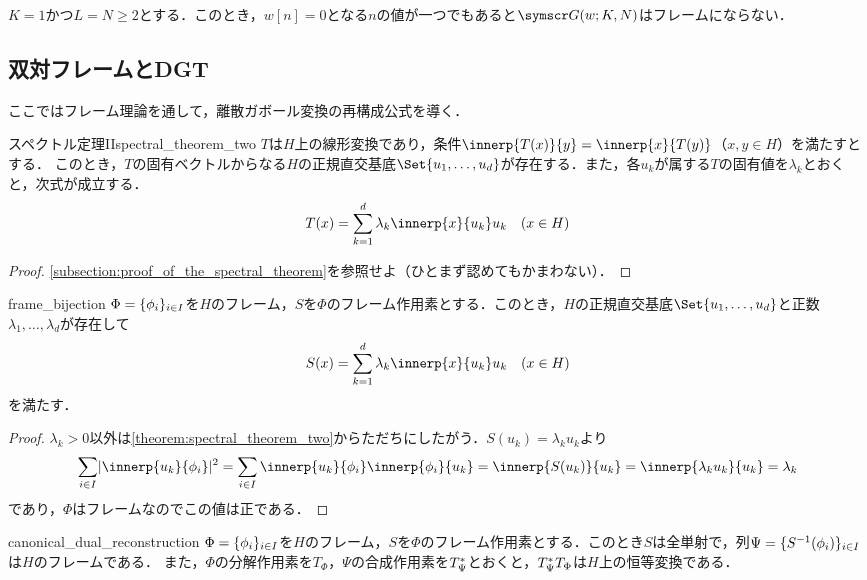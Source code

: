 \documentclass[../../main]{subfiles}
\begin{document}
\begin{example}
  \(K=1\)かつ\(L=N\geq 2\)とする．このとき，\(w[n]=0\)となる\(n\)の値が一つでもあると\(\gaborsys{w}{K}{N}\)はフレームにならない．
\end{example}

\subsection{双対フレームとDGT}

ここではフレーム理論を通して，離散ガボール変換の再構成公式を導く．

\begin{theorem}{スペクトル定理II}{spectral_theorem_two}
  \(T\)は\(H\)上の線形変換であり，条件\(\innerp{T(x)}{y}=\innerp{x}{T(y)}\)（\(x,y\in H\)）を満たすとする．
  このとき，\(T\)の固有ベクトルからなる\(H\)の正規直交基底\(\Set{u_1,\dots,u_d}\)が存在する．また，各\(u_k\)が属する\(T\)の固有値を\(\lambda_k\)とおくと，次式が成立する．
  \[
    T(x) = \sum_{k=1}^d\lambda_k\innerp{x}{u_k}u_k\quad(x\in H)
  \]
\end{theorem}

\begin{proof}
  \cref{subsection:proof_of_the_spectral_theorem}を参照せよ（ひとまず認めてもかまわない）．
\end{proof}

\begin{corollary}{}{frame_bijection}
  \(\Phi=\lbrace\phi_i\rbrace_{i\in I}\)を\(H\)のフレーム，\(S\)を\(\Phi\)のフレーム作用素とする．このとき，\(H\)の正規直交基底\(\Set{u_1,\dots,u_d}\)と正数\(\lambda_1,\dots,\lambda_d\)が存在して
  \[
    S(x) = \sum_{k=1}^d\lambda_k\innerp{x}{u_k}u_k\quad(x\in H)
  \]
  を満たす．
\end{corollary}

\begin{proof}
  \(\lambda_k>0\)以外は\cref{theorem:spectral_theorem_two}からただちにしたがう．\(S(u_k)=\lambda_ku_k\)より
  \[
    \sum_{i\in I}\abs{\innerp{u_k}{\phi_i}}^2 = \sum_{i\in I}\innerp{u_k}{\phi_i}\innerp{\phi_i}{u_k}
    = \innerp{S(u_k)}{u_k}
    = \innerp{\lambda_ku_k}{u_k}
    = \lambda_k
  \]
  であり，\(\Phi\)はフレームなのでこの値は正である．
\end{proof}

\begin{proposition}{}{canonical_dual_reconstruction}
  \(\Phi=\lbrace\phi_i\rbrace_{i\in I}\)を\(H\)のフレーム，\(S\)を\(\Phi\)のフレーム作用素とする．このとき\(S\)は全単射で，列\(\Psi=\lbrace S^{-1}(\phi_i)\rbrace_{i\in I}\)は\(H\)のフレームである．
  また，\(\Phi\)の分解作用素を\(T_\Phi\)，\(\Psi\)の合成作用素を\(T_\Psi^{\mathord{\ast}}\)とおくと，\(T_\Psi^{\mathord{\ast}}T_\Phi\)は\(H\)上の恒等変換である．
\end{proposition}
\end{document}
